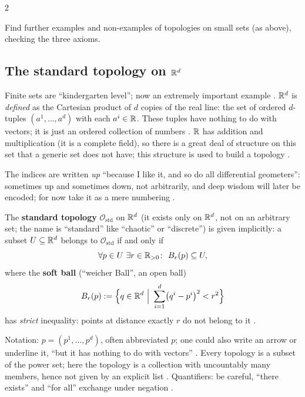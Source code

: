 \begin{paracol}{2}
\begin{exercise}\label{ex:tm-ex-sheet}
Find further examples and non-examples of topologies on small sets (as above), checking the three axioms.
\end{exercise}

\subsection{The standard topology on $\mathbb{R}^d$}\label{ssec:tm-standard}

Finite sets are ``kindergarten level''; now an extremely important example .
$\mathbb{R}^d$ is \emph{defined} as the Cartesian product of $d$ copies of the real line: the set of ordered $d$-tuples
$(a^1,\dots,a^d)$ with each $a^i\in\mathbb{R}$. These tuples have nothing to do with vectors; it is just an ordered
collection of numbers . $\mathbb{R}$ has addition and multiplication (it is a
complete field), so there is a great deal of structure on this set that a generic set does not have; this structure is
used to build a topology .
\begin{coursenote}[Indices up]
The indices are written \emph{up} ``because I like it, and so do all differential geometers'': sometimes up and sometimes
down, not arbitrarily, and deep wisdom will later be encoded; for now take it as a mere numbering
.
\end{coursenote}

\begin{definition}\label{def:tm-standard}
The \textbf{standard topology} $\mathcal O_{\mathrm{std}}$ on $\mathbb{R}^d$ (it exists only on $\mathbb{R}^d$, not on an arbitrary set;
the name is ``standard'' like ``chaotic'' or ``discrete'') is given implicitly: a subset $U\subseteq\mathbb{R}^d$ belongs to
$\mathcal O_{\mathrm{std}}$ if and only if
\[
  \forall p\in U\ \exists r\in\mathbb{R}_{>0}\colon\ B_r(p)\subseteq U,
\]
where the \textbf{soft ball} (``weicher Ball'', an open ball)
\[
  B_r(p):=\Bigl\{q\in\R^d\ \Big|\ \sum_{i=1}^d\bigl(q^i-p^i\bigr)^2<r^2\Bigr\}
\]
has \emph{strict} inequality: points at distance exactly $r$ do not belong to it
.
\end{definition}
Notation: $p=(p^1,\dots,p^d)$, often abbreviated $p$; one could also write an arrow or underline it, ``but it has nothing to
do with vectors'' . Every topology is a subset of the power set; here the topology is a collection
with uncountably many members, hence not given by an explicit list .
Quantifiers: be careful, ``there exists'' and ``for all'' exchange under negation .


\end{paracol}
